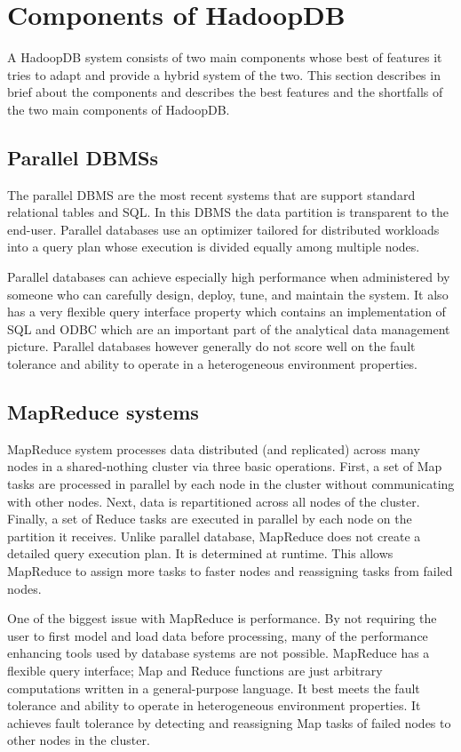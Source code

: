 \documentclass[9pt,twocolumn,twoside]{styles/osajnl}
\begin{document}
\section{Components of HadoopDB}
A HadoopDB \cite{hadoopdb-project} system consists of two main components whose best of features it tries to adapt and provide a hybrid system of the two. This section describes in brief about the components and describes the best features and the shortfalls of the two main components of HadoopDB.

\subsection{Parallel DBMSs}
The parallel DBMS are the most recent systems that are support standard relational tables and SQL. In this DBMS the data partition is transparent to the end-user. Parallel databases use an optimizer tailored for distributed workloads into a query plan whose execution is divided equally among multiple nodes.
 
Parallel databases can achieve especially high performance when administered by someone who can carefully design, deploy, tune, and maintain the system. It also has a very flexible query interface property which contains an implementation of SQL and ODBC which are an important part of the analytical data management picture. Parallel databases however generally do not score well on the fault tolerance and ability to operate in a heterogeneous environment properties. 
    
\subsection{MapReduce systems}
MapReduce system processes data distributed (and replicated) across many nodes in a shared-nothing cluster via three basic operations. First, a set of Map tasks are processed in parallel by each node in the cluster without communicating with other nodes. Next, data is repartitioned across all nodes of the cluster. Finally, a set of Reduce tasks are executed in parallel by each node on the partition it receives. Unlike parallel database, MapReduce does not create a detailed query execution plan. It is determined at runtime. This allows MapReduce to assign more tasks to faster nodes and reassigning tasks from failed nodes. 

One of the biggest issue with MapReduce is performance. By not requiring the user to first model and load data before processing, many of the performance enhancing tools used by database systems are not possible. MapReduce has a flexible query interface; Map and Reduce functions are just arbitrary computations written in a general-purpose language. It best meets the fault tolerance and ability to operate in heterogeneous environment properties. It achieves fault tolerance by detecting and reassigning Map tasks of failed nodes to other
nodes in the cluster.
\end{document}
